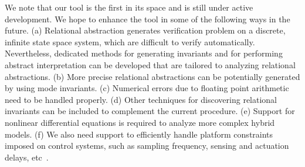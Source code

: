 \documentclass{llncs}
\begin{document}

We note that our tool is the first in its space and is still
under active development.  We hope to
enhance the tool in some of the following ways 
in the future. %
(a) Relational abstraction generates verification 
problem on a discrete, infinite state space system, which are difficult to
verify automatically.  
Nevertheless, dedicated methods for generating 
invariants and for performing abstract interpretation can be developed
that are tailored to analyzing relational abstractions.
(b) More precise relational abstractions can be potentially generated
by using mode invariants.
(c) Numerical errors due to floating point arithmetic need
to be handled properly.
(d) Other techniques for discovering relational
invariants can be included to complement the current procedure.
(e) Support for nonlinear differential equations is required to
analyze more complex hybrid models.
(f) We also need support to efficiently handle platform constraints
imposed on control systems, such as sampling frequency, 
sensing and actuation delays, etc~\cite{ZST12:CAV}.%
\end{document}
